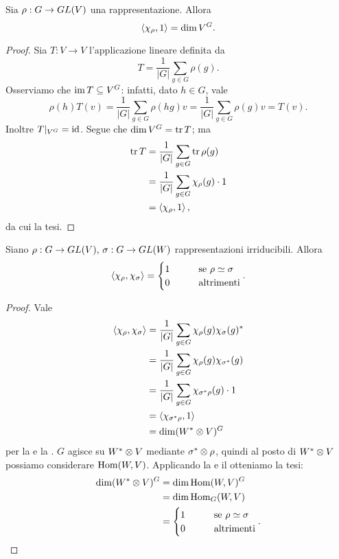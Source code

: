 \begin{proposition}
Sia $\rho:G\to GL(V)$ una rappresentazione. Allora
$$
\left\langle\chi_\rho,1\right\rangle=\dim V^G.
$$
\end{proposition}
\begin{proof}
Sia $T:V\to V$ l'applicazione lineare definita da
$$
T=\frac{1}{|G|}\sum_{g\in G}\rho(g).
$$
Osserviamo che $\operatorname{im} T\subseteq V^G$: infatti, dato $h\in G$, vale
$$
\rho(h)T(v)=\frac{1}{|G|}\sum_{g\in G}\rho(hg)v=\frac{1}{|G|}\sum_{g\in G}\rho(g)v=T(v).
$$
Inoltre $T|_{V^G}=\operatorname{id}$. Segue che $\dim V^G=\operatorname{tr} T$; ma
\begin{align*}
\operatorname{tr} T&=\frac{1}{|G|}\sum_{g\in G}\operatorname{tr}\rho(g)\\
&=\frac{1}{|G|}\sum_{g\in G}\chi_\rho(g)\cdot1\\
&=\left\langle\chi_\rho,1\right\rangle,
\end{align*}
da cui la tesi.
\end{proof}

\begin{proposition}
Siano $\rho:G\to GL(V),\,\allowbreak\sigma:G\to GL(W)$ rappresentazioni irriducibili. Allora 
$$
\left\langle\chi_\rho,\chi_\sigma\right\rangle=
\begin{cases}
1\qquad&\text{se $\rho\simeq\sigma$}\\
0\qquad&\text{altrimenti}
\end{cases}.
$$
\end{proposition}
\begin{proof}
Vale
\begin{align*}
\left\langle\chi_\rho,\chi_\sigma\right\rangle&=\frac{1}{|G|}\sum_{g\in G}\chi_\rho(g)\chi_\sigma(g)^*\\
&=\frac{1}{|G|}\sum_{g\in G}\chi_\rho(g)\chi_{\sigma^*}(g)\\
&=\frac{1}{|G|}\sum_{g\in G}\chi_{\sigma^*\rho}(g)\cdot1\\
&=\left\langle\chi_{\sigma^*\rho},1\right\rangle\\
&=\dim(W^*\otimes V)^G
\end{align*}
per la  e la . $G$ agisce su $W^*\otimes V$ mediante $\sigma^*\otimes\rho$, quindi al posto di $W^*\otimes V$ possiamo considerare $\operatorname{Hom}(W,V)$. Applicando la  e il  otteniamo la tesi:
\begin{align*}
\dim(W^*\otimes V)^G&=\dim\operatorname{Hom}(W,V)^G\\
&=\dim\operatorname{Hom}_G(W,V)\\
&=
\begin{cases}
1\qquad&\text{se $\rho\simeq\sigma$}\\
0\qquad&\text{altrimenti}
\end{cases}.
\end{align*}
\end{proof}

